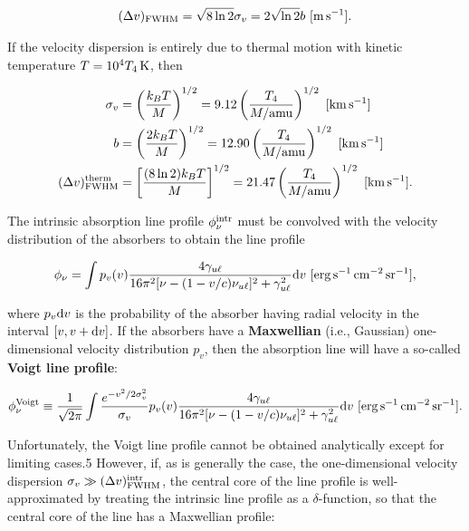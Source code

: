 \documentclass[a4paper,10pt]{article}
\begin{document}
\begin{align*}
    (\Delta v)_{\rm FWHM} = \sqrt{8\ln2}\sigma_v = 2\sqrt{\ln2}b ~ [{\rm m\,s^{-1}}].
\end{align*}

{\noindent}If the velocity dispersion is entirely due to thermal motion with kinetic temperature $T=10^4T_4\,{\rm K}$, then

\begin{align*}
    \sigma_v &= \left(\frac{k_BT}{M}\right)^{1/2} = 9.12\left(\frac{T_4}{M/{\rm amu}}\right)^{1/2} ~ [{\rm km\,s^{-1}}] \\
    b &= \left(\frac{2k_BT}{M}\right)^{1/2} = 12.90\left(\frac{T_4}{M/{\rm amu}}\right)^{1/2} ~ [{\rm km\,s^{-1}}] \\
    (\Delta v)_{\rm FWHM}^{\rm therm} &= \left[\frac{(8\ln2)k_BT}{M}\right]^{1/2} = 21.47\left(\frac{T_4}{M/{\rm amu}}\right)^{1/2} ~ [{\rm km\,s^{-1}}].
\end{align*}

{\noindent}The intrinsic absorption line profile $\phi_\nu^{\rm intr}$ must be convolved with the velocity distribution of the absorbers to obtain the line profile

\begin{align*}
    \phi_\nu = \int p_v(v) \frac{4\gamma_{u\ell}}{16\pi^2[\nu-(1-v/c)\nu_{u\ell}]^2 + \gamma_{u\ell}^2}{\rm d}v ~ [{\rm erg\,s^{-1}\,cm^{-2}\,sr^{-1}}],
\end{align*}

{\noindent}where $p_v{\rm d}v$ is the probability of the absorber having radial velocity in the interval $[v,v+{\rm d}v]$. If the absorbers have a \textbf{Maxwellian} (i.e., Gaussian) one-dimensional velocity distribution $p_v$, then the absorption line will have a so-called \textbf{Voigt line profile}:

\begin{align*}
    \phi_\nu^{\rm Voigt} \equiv \frac{1}{\sqrt{2\pi}} \int \frac{e^{-v^2/2\sigma_v^2}}{\sigma_v} p_v(v) \frac{4\gamma_{u\ell}}{16\pi^2[\nu-(1-v/c)\nu_{u\ell}]^2 + \gamma_{u\ell}^2}{\rm d}v ~ [{\rm erg\,s^{-1}\,cm^{-2}\,sr^{-1}}].
\end{align*}

{\noindent}Unfortunately, the Voigt line profile cannot be obtained analytically except for limiting cases.5 However, if, as is generally the case, the one-dimensional velocity dispersion $\sigma_v\gg (\Delta v)_{\rm FWHM}^{\rm intr}$, the central core of the line profile is well-approximated by treating the intrinsic line profile as a $\delta$-function, so that the central core of the line has a Maxwellian profile:
\end{document}
